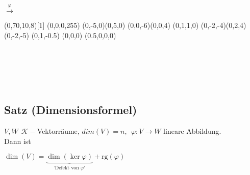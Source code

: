\documentclass[12pt,titlepage, pdf]{article}
\newcommand{\R}{\mathds{R}}
\newcommand{\K}{\mathcal{K}}
\newcommand{\rg}{\textrm{rg}}
\renewcommand{\>}{\rightarrow}
\renewcommand{\*}{\cdot}
\renewcommand{\phi}{\varphi}
\begin{document}
		      			\begin{minipage}[c]{0.15\textwidth}~\\
		      				~\\
		      				~\\
		      				~\\
		      				~\\
		      				~\\
		      				\centering	$\overset{\phi}{\longrightarrow}$
		      			\end{minipage}
		      			\begin{minipage}[c]{0.425\textwidth}
		      				\Viewpoint(0,70,10,8)[1]
		      				\SetCMYKColor(0,0,0,255)
		      				\SetNormal
		      				\DDArrowAt(0,-5,0)(0,5,0)
		      				\DDArrowAt(0,0,-6)(0,0,4)
		      				\Text[r]{$y~~~~~~~~~~~~~~~~~~~~~\R^2$}
		      				\SetCMYKColor(0,1,1,0)
		      				\DDArrowAt(0,-2,-4)(0,2,4)
		      				\Text[b]{$\phi(\R^3)$}
		      				\DDMoveTo(0,-2,-5)
		      				\Text[c]{$\phi(\langle v\rangle)$}
		      				\DDMoveTo(0,1,-0.5)
		      				\Text[c]{$\ker\phi$}
		      				\DDMoveTo(0,0,0)
		      				\SetCMYKColor(0.5,0,0,0)
		      				\BigPoint
		      				\CloseGraph
		      			\end{minipage}\\
		      			\\
		      			\\
		      			\\
		      			\subsection{Satz (Dimensionsformel)}
		      			\label{6.14}
		      			$V,W ~~\K-$Vektorräume, $dim(V) = n,~~ \phi: V \rightarrow W$ lineare Abbildung.\\
		      			Dann ist 
		      			\begin{center}
		      				$\dim(V)= \underbrace{\dim(\ker\phi)}_{\text{'Defekt von }\phi'} + \rg(\phi)$
		      			\end{center}
\end{document}
